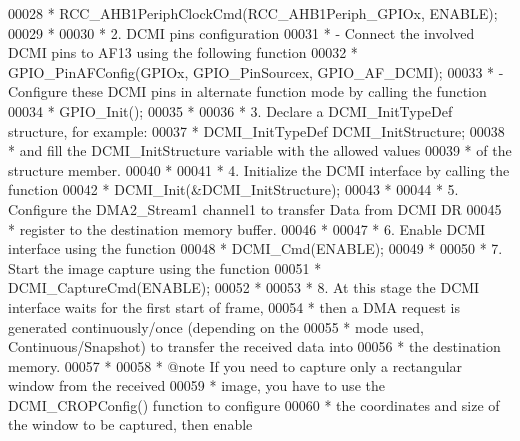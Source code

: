 \begin{DoxyCode}
00028 \textcolor{comment}{  *                 RCC\_AHB1PeriphClockCmd(RCC\_AHB1Periph\_GPIOx, ENABLE);}
00029 \textcolor{comment}{  *}
00030 \textcolor{comment}{  *          2. DCMI pins configuration }
00031 \textcolor{comment}{  *             - Connect the involved DCMI pins to AF13 using the following function }
00032 \textcolor{comment}{  *                 GPIO\_PinAFConfig(GPIOx, GPIO\_PinSourcex, GPIO\_AF\_DCMI); }
00033 \textcolor{comment}{  *             - Configure these DCMI pins in alternate function mode by calling the function}
00034 \textcolor{comment}{  *                 GPIO\_Init();}
00035 \textcolor{comment}{  *    }
00036 \textcolor{comment}{  *          3. Declare a DCMI\_InitTypeDef structure, for example:}
00037 \textcolor{comment}{  *                 DCMI\_InitTypeDef  DCMI\_InitStructure;}
00038 \textcolor{comment}{  *             and fill the DCMI\_InitStructure variable with the allowed values}
00039 \textcolor{comment}{  *             of the structure member.}
00040 \textcolor{comment}{  *  }
00041 \textcolor{comment}{  *          4. Initialize the DCMI interface by calling the function}
00042 \textcolor{comment}{  *                 DCMI\_Init(&DCMI\_InitStructure); }
00043 \textcolor{comment}{  *  }
00044 \textcolor{comment}{  *          5. Configure the DMA2\_Stream1 channel1 to transfer Data from DCMI DR}
00045 \textcolor{comment}{  *             register to the destination memory buffer.}
00046 \textcolor{comment}{  *  }
00047 \textcolor{comment}{  *          6. Enable DCMI interface using the function}
00048 \textcolor{comment}{  *                 DCMI\_Cmd(ENABLE);}
00049 \textcolor{comment}{  *                 }
00050 \textcolor{comment}{  *         7. Start the image capture using the function}
00051 \textcolor{comment}{  *                 DCMI\_CaptureCmd(ENABLE);}
00052 \textcolor{comment}{  *                 }
00053 \textcolor{comment}{  *         8. At this stage the DCMI interface waits for the first start of frame,}
00054 \textcolor{comment}{  *            then a DMA request is generated continuously/once (depending on the}
00055 \textcolor{comment}{  *            mode used, Continuous/Snapshot) to transfer the received data into}
00056 \textcolor{comment}{  *            the destination memory. }
00057 \textcolor{comment}{  *   }
00058 \textcolor{comment}{  *  @note  If you need to capture only a rectangular window from the received}
00059 \textcolor{comment}{  *         image, you have to use the DCMI\_CROPConfig() function to configure }
00060 \textcolor{comment}{  *         the coordinates and size of the window to be captured, then enable }

\end{DoxyCode}
